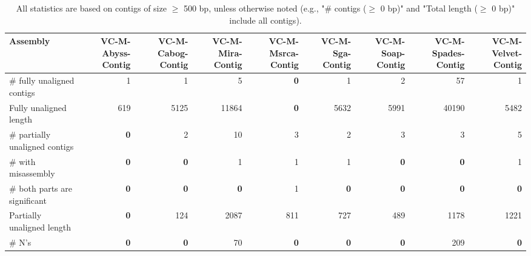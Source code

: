 \documentclass[12pt,a4paper]{article}
\begin{document}
\begin{table}[ht]
\begin{center}
\caption{All statistics are based on contigs of size $\geq$ 500 bp, unless otherwise noted (e.g., "\# contigs ($\geq$ 0 bp)" and "Total length ($\geq$ 0 bp)" include all contigs).}
\begin{tabular}{|l*{8}{|r}|}
\hline
Assembly & VC-M-Abyss-Contig & VC-M-Cabog-Contig & VC-M-Mira-Contig & VC-M-Msrca-Contig & VC-M-Sga-Contig & VC-M-Soap-Contig & VC-M-Spades-Contig & VC-M-Velvet-Contig \\ \hline
\# fully unaligned contigs & 1 & 1 & 5 & {\bf 0} & 1 & 2 & 57 & 1 \\ \hline
Fully unaligned length & 619 & 5125 & 11864 & {\bf 0} & 5632 & 5991 & 40190 & 5482 \\ \hline
\# partially unaligned contigs & {\bf 0} & 2 & 10 & 3 & 2 & 3 & 3 & 5 \\ \hline
\hspace{5mm}\# with misassembly & {\bf 0} & {\bf 0} & 1 & 1 & 1 & {\bf 0} & {\bf 0} & 1 \\ \hline
\hspace{5mm}\# both parts are significant & {\bf 0} & {\bf 0} & {\bf 0} & 1 & {\bf 0} & {\bf 0} & {\bf 0} & {\bf 0} \\ \hline
Partially unaligned length & {\bf 0} & 124 & 2087 & 811 & 727 & 489 & 1178 & 1221 \\ \hline
\# N's & {\bf 0} & {\bf 0} & 70 & {\bf 0} & {\bf 0} & {\bf 0} & 209 & {\bf 0} \\ \hline
\end{tabular}
\end{center}
\end{table}
\end{document}

